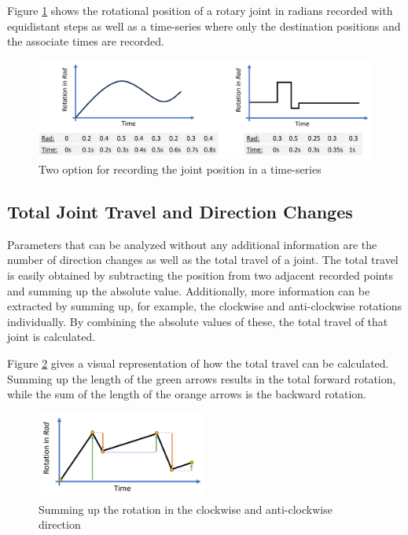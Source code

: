 Figure \ref{equi} shows the rotational position of a rotary joint in radians recorded with equidistant steps as well as a time-series where only the destination positions and the associate times are recorded.


\begin{figure}[H]
	\centerline{\includegraphics[width=1\textwidth]{figures/equionchange.png}}
	\caption{Two option for recording the joint position in a time-series}
	\label{equi}
\end{figure}


\subsection{Total Joint Travel and Direction Changes}
Parameters that can be analyzed without any additional information are the number of direction changes as well as the total travel of a joint. The total travel is easily obtained by subtracting the position from two adjacent recorded points and summing up the absolute value. Additionally, more information can be extracted by summing up, for example, the clockwise and anti-clockwise rotations individually. By combining the absolute values of these, the total travel of that joint is calculated.

Figure \ref{travel} gives a visual representation of how the total travel can be calculated. Summing up the length of the green arrows results in the total forward rotation, while the sum of the length of the orange arrows is the backward rotation.

\begin{figure}[H]
	\centerline{\includegraphics[width=0.5\textwidth]{figures/travel.png}}
	\caption{Summing up the rotation in the clockwise and anti-clockwise direction }
	\label{travel}
\end{figure}

